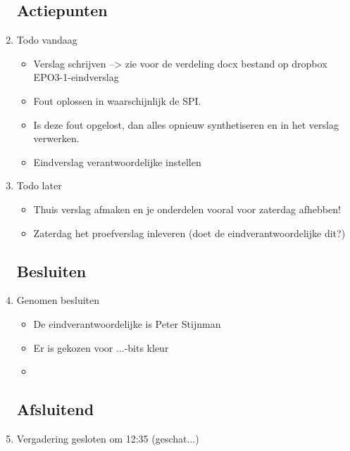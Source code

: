 \documentclass{article}
\begin{document}
\begin{enumerate}
	\subsection*{Actiepunten}
	\item Todo vandaag
	\begin{itemize}
		\item Verslag schrijven --> zie voor de verdeling docx bestand op dropbox EPO3-1\Eindverslag\verdeling-eindverslag
		\item Fout oplossen in waarschijnlijk de SPI. 
		\item Is deze fout opgelost, dan alles opnieuw synthetiseren en in het verslag verwerken. 
		\item Eindverslag verantwoordelijke instellen

	\end{itemize}
	\item Todo later
	\begin{itemize}
		\item Thuis verslag afmaken en je onderdelen vooral voor zaterdag afhebben!
		\item Zaterdag het proefverslag inleveren  (doet de eindverantwoordelijke dit?)
	\end{itemize}

	\subsection*{Besluiten}
	\item Genomen besluiten
	\begin{itemize}
		\item De eindverantwoordelijke is Peter Stijnman
		\item Er is gekozen voor ...-bits kleur
		\item 
	\end{itemize}

	\noindent 
	\subsection*{Afsluitend}
	\item Vergadering gesloten om 12:35 (geschat...)%

\end{enumerate}
\end{document}
